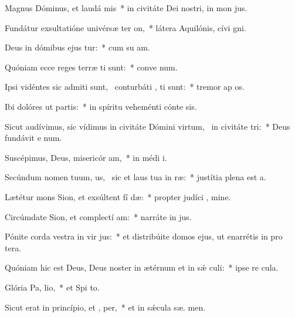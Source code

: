 \item Magnus Dóminus, et laudá mis~* in civitáte Dei nostri, in mon  jus.
\item Fundátur exsultatióne univérsæ ter  on,~* látera Aquilónis, cívi  gni.
\item Deus in dómibus ejus tur:~* cum su am.
\item Quóniam ecce reges terræ ti sunt:~* conve  num.
\item Ipsi vidéntes sic admiti sunt,~\pscross{} conturbáti , ti sunt:~* tremor ap os.
\item Ibi dolóres ut partis:~* in spíritu veheménti cónte  sis.
\item Sicut audívimus, sic vídimus in civitáte Dómini virtum,~\pscross{} in civitáte  tri:~* Deus fundávit e  num.
\item Suscépimus, Deus, misericór am,~* in médi  i.
\item Secúndum nomen tuum, us,~\pscross{} sic et laus tua in  ræ:~* justítia plena est  a.
\item Lætétur mons Sion, et exsúltent fí dæ:~* propter judíci , mine.
\item Circúmdate Sion, et complectí am:~* narráte in  jus.
\item Pónite corda vestra in vir jus:~* et distribúite domos ejus, ut enarrétis in pro tera.
\item Quóniam hic est Deus, Deus noster in ætérnum et in sǽ culi:~* ipse re   cula.
\item Glória Pa,  lio,~* et Spi to.
\item Sicut erat in princípio, et ,  per,~* et in sǽcula sæ. men.
